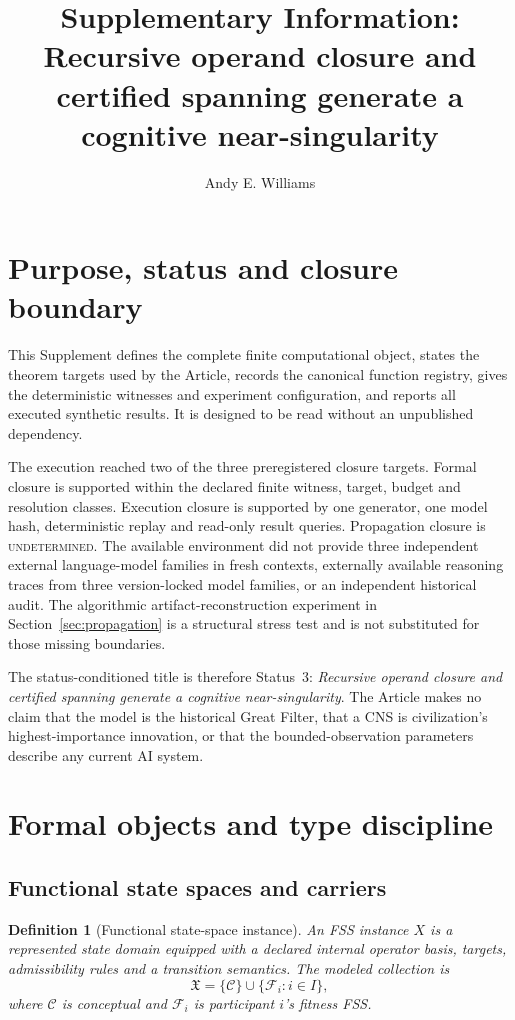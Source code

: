 \documentclass[10pt]{article}
\title{\textbf{Supplementary Information: Recursive operand closure and certified spanning generate a cognitive near-singularity}}
\author{Andy E. Williams}
\date{}
\newtheorem{definition}{Definition}
\newcommand{\Und}{\textsc{undetermined}}
\begin{document}
\maketitle
\tableofcontents
\newpage

\section{Purpose, status and closure boundary}
This Supplement defines the complete finite computational object, states the theorem targets used by the Article, records the canonical function registry, gives the deterministic witnesses and experiment configuration, and reports all executed synthetic results. It is designed to be read without an unpublished dependency.

The execution reached two of the three preregistered closure targets. Formal closure is supported within the declared finite witness, target, budget and resolution classes. Execution closure is supported by one generator, one model hash, deterministic replay and read-only result queries. Propagation closure is \Und. The available environment did not provide three independent external language-model families in fresh contexts, externally available reasoning traces from three version-locked model families, or an independent historical audit. The algorithmic artifact-reconstruction experiment in Section~\ref{sec:propagation} is a structural stress test and is not substituted for those missing boundaries.

The status-conditioned title is therefore Status~3: \emph{Recursive operand closure and certified spanning generate a cognitive near-singularity}. The Article makes no claim that the model is the historical Great Filter, that a CNS is civilization's highest-importance innovation, or that the bounded-observation parameters describe any current AI system.

\section{Formal objects and type discipline}

\subsection{Functional state spaces and carriers}
\begin{definition}[Functional state-space instance]
An FSS instance $X$ is a represented state domain equipped with a declared internal operator basis, targets, admissibility rules and a transition semantics. The modeled collection is
\begin{equation}
\mathfrak X=\{\mathcal C\}\cup\{\mathcal F_i:i\in I\},
\end{equation}
where $\mathcal C$ is conceptual and $\mathcal F_i$ is participant $i$'s fitness FSS.
\end{definition}
\end{document}
